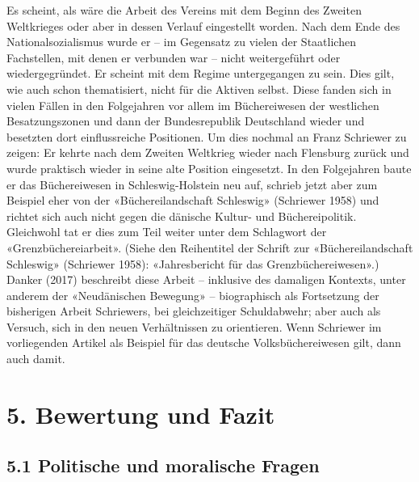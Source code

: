 \documentclass[a4paper,
fontsize=11pt,
oneside,
numbers=noperiodatend,
parskip=half-,
bibliography=totoc,
final
]{scrartcl}
\begin{document}
Es scheint, als wäre die Arbeit des Vereins mit dem Beginn des Zweiten
Weltkrieges oder aber in dessen Verlauf eingestellt worden. Nach dem
Ende des Nationalsozialismus wurde er -- im Gegensatz zu vielen der
Staatlichen Fachstellen, mit denen er verbunden war -- nicht
weitergeführt oder wiedergegründet. Er scheint mit dem Regime
untergegangen zu sein. Dies gilt, wie auch schon thematisiert, nicht für
die Aktiven selbst. Diese fanden sich in vielen Fällen in den
Folgejahren vor allem im Büchereiwesen der westlichen Besatzungszonen
und dann der Bundesrepublik Deutschland wieder und besetzten dort
einflussreiche Positionen. Um dies nochmal an Franz Schriewer zu zeigen:
Er kehrte nach dem Zweiten Weltkrieg wieder nach Flensburg zurück und
wurde praktisch wieder in seine alte Position eingesetzt. In den
Folgejahren baute er das Büchereiwesen in Schleswig-Holstein neu auf,
schrieb jetzt aber zum Beispiel eher von der «Büchereilandschaft
Schleswig» (Schriewer 1958) und richtet sich auch nicht gegen die
dänische Kultur- und Büchereipolitik. Gleichwohl tat er dies zum Teil
weiter unter dem Schlagwort der «Grenzbüchereiarbeit». (Siehe den
Reihentitel der Schrift zur «Büchereilandschaft Schleswig» (Schriewer
1958): «Jahresbericht für das Grenzbüchereiwesen».) Danker (2017)
beschreibt diese Arbeit -- inklusive des damaligen Kontexts, unter
anderem der «Neudänischen Bewegung» -- biographisch als Fortsetzung der
bisherigen Arbeit Schriewers, bei gleichzeitiger Schuldabwehr; aber auch
als Versuch, sich in den neuen Verhältnissen zu orientieren. Wenn
Schriewer im vorliegenden Artikel als Beispiel für das deutsche
Volksbüchereiwesen gilt, dann auch damit.

\hypertarget{bewertung-und-fazit}{%
\section{5. Bewertung und Fazit}\label{bewertung-und-fazit}}

\hypertarget{politische-und-moralische-fragen}{%
\subsection{5.1 Politische und moralische
Fragen}\label{politische-und-moralische-fragen}}
\end{document}
